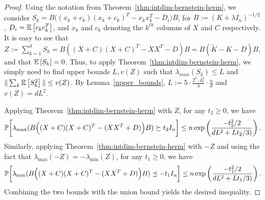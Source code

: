 \documentclass[12pt]{article}
\newcommand{\tK}{\tilde{K}}
\newcommand{\defeq}{:=}
\begin{document}
\begin{proof}
	Using the notation from Theorem~\ref{thm:intdim-bernstein-herm},
	we consider $S_k = B\Big((x_k + c_k)(x_k + c_k)^T  - x_k x_k^T - D_i\Big)B$, for $B\defeq (K+\lambda I_n)^{-1/2}$, $D_i = \expect{}{c_k c_k^T}$, and $x_k$ and $c_k$ denoting the $k^{th}$ columns of $X$ and $C$ respectively.
	It is easy to see that $Z\defeq \sum_{k=1}^d S_k = B((X+C)(X+C)^T - XX^T - D)B = B(\tK - K - D)B$, and that $\expect{}{S_k} = 0$.
	Thus, to apply Theorem~\ref{thm:intdim-bernstein-herm}, we simply need to find upper bounds $L,v(Z)$ such that $\lambda_{max}(S_k) \leq L$ and  $\|\sum_k \expect{}{S_k^2}\| \leq v(Z)$.
	By Lemma~\ref{upper_bounds}, $L \defeq 5 \cdot \frac{2^b \cdot \delta_b^2}{\lambda}\cdot  \frac{n}{d}$ and $v(Z) = dL^2$.
	
	Applying Theorem~\ref{thm:intdim-bernstein-herm} with $Z$, for any $t_2 \geq 0$,
	we have
	\begin{equation*}
	\Prob\bigg[\lambda_{\max}(B\Big((X + C)(X + C)^T - (XX^T+D)\Big)B) \succeq t_2 I_n \bigg] \leq n
	\exp \left( \frac{-t_2^2/2}{dL^2 + Lt_2/3)} \right).
	\end{equation*}
	Similarly, applying Theorem~\ref{thm:intdim-bernstein-herm} with $-Z$ and
	using the fact that $\lambda_{\max}(-Z) = -\lambda_{\min}(Z)$, for any $t_1 \geq 0$,
	we have
	\begin{equation*}
	\Prob\bigg[\lambda_{\min}(B\Big((X + C)(X + C)^T - (XX^T+D)\Big)B) \preceq -t_1 I_n \bigg] \leq n
	\exp \left( \frac{-t_1^2/2}{dL^2 + Lt_1/3)} \right).
	\end{equation*}
	Combining the two bounds with the union bound yields the desired inequality.
\end{proof}
\end{document}
